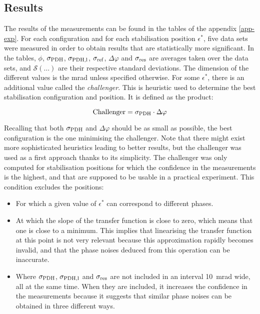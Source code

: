 
\subsection{Results}

The results of the measurements can be found in the tables of the appendix \ref{app-exp}. For each \pdh configuration and for each \pdh stabilisation position $\epsilon^*$, five data sets were measured in order to obtain results that are statistically more significant. In the tables, $\phi$, $\sigma_{\text{PDH}}$, $\sigma_{\text{PDH,l}}$, $\sigma_{\text{ref}}$, $\Delta \varphi$ and $\sigma_{\text{res}}$ are averages taken over the data sets, and $\mathcal{S}(\dots)$ are their respective standard deviations. The dimension of the different values is the \si{\milli\radian} unless specified otherwise. For some $\epsilon^*$, there is an additional value called the \textit{challenger}. This is heuristic used to determine the best stabilisation configuration and position. It is defined as the product:

\begin{equation}
	\text{Challenger} = \sigma_{\text{PDH}} \cdot \Delta \varphi
\end{equation}

Recalling that both $\sigma_{\text{PDH}}$ and $\Delta \varphi$ should be as small as possible, the best configuration is the one minimising the challenger. Note that there might exist more sophisticated heuristics leading to better results, but the challenger was used as a first approach thanks to its simplicity. The challenger was only computed for stabilisation positions for which the confidence in the measurements is the highest, and that are supposed to be usable in a practical \rc experiment. This condition excludes the positions:

\begin{itemize}
	\item For which a given value of $\epsilon^*$ can correspond to different phases.
	\item At which the slope of the transfer function is close to zero, which means that one is close to a minimum. This implies that linearising the transfer function at this point is not very relevant because this approximation rapidly becomes invalid, and that the phase noises deduced from this operation can be inaccurate.
	\item Where $\sigma_{\text{PDH}}$,  $\sigma_{\text{PDH,l}}$ and $\sigma_{\text{res}}$ are not included in an interval \SI{10}{\milli\radian} wide, all at the same time. When they are included, it increases the confidence in the measurements because it suggests that similar phase noises can be obtained in three different ways.
\end{itemize}

